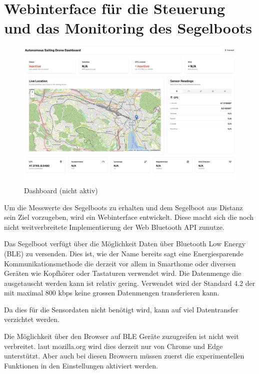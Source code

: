 \section{Webinterface für die Steuerung und das Monitoring des Segelboots}

\begin{figure}[H]
    \centering
    \includegraphics[width=1\linewidth]{assets/not cconnected interface.png}
    \caption{Dashboard (nicht aktiv)}
    \label{fig:enter-label}
\end{figure}

Um die Messwerte des Segelboots zu erhalten und dem Segelboot aus Distanz sein Ziel vorzugeben, wird ein Webinterface entwickelt. Diese macht sich die noch nicht weitverbreitete Implementierung der Web Bluetooth API zunutze. 

Das Segelboot verfügt über die Möglichkeit Daten über Bluetooth Low Energy (BLE) zu versenden. Dies ist, wie der Name bereits sagt eine Energiesparende Kommunikationsmethode die derzeit vor allem in Smarthome oder diversen Geräten wie Kopfhörer oder Tastaturen verwendet wird. Die Datenmenge die ausgetauscht werden kann ist relativ gering. Verwendet wird der Standard 4.2 der mit maximal 800 kbps keine grossen Datenmengen transferieren kann. 

Da dies für die Sensordaten nicht benötigt wird, kann auf viel Datentransfer verzichtet werden.


Die Möglichkeit über den Browser auf BLE Geräte zuzugreifen ist nicht weit verbreitet. laut mozilla.org wird dies derzeit nur von Chrome und Edge unterstützt. Aber auch bei diesen Browsern müssen zuerst die experimentellen Funktionen in den Einstellungen aktiviert werden.

